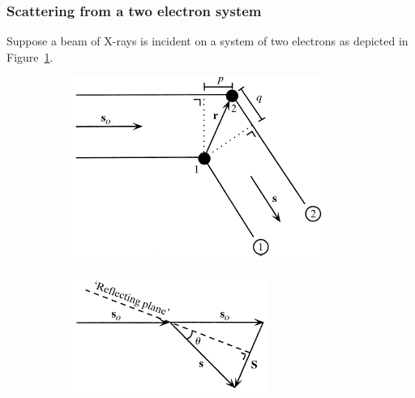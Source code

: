         \subsubsection{Scattering from a two electron system}
        \label{subs:Scattering from two electron system}
            Suppose a beam of X-rays is incident on a system of two electrons as depicted in Figure~\ref{fig:Two electron system}.
            \begin{figure}
                \centering
                \begin{subfigure}[b]{0.45\textwidth}
                        \centering
                        \includegraphics[width=\textwidth]{figures/introduction/twoelectronsystem.png}
                        \caption{}
                        \label{fig:Two electron system}
                \end{subfigure}
                \qquad
                \begin{subfigure}[b]{0.45\textwidth}
                        \centering
                        \includegraphics[width=\textwidth]{figures/introduction/scatteringvector.png}

\end{subfigure}
\end{figure}
